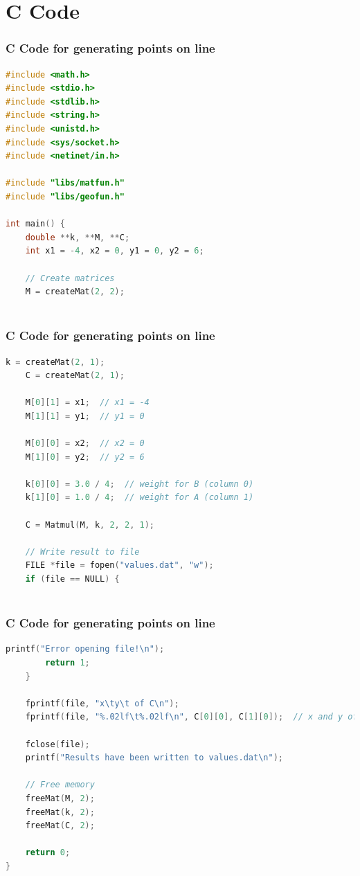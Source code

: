 \documentclass{beamer}
\theoremstyle{remark}
\numberwithin{equation}{section}
\begin{document}
\section{C Code}
\begin{frame}[fragile]
\frametitle{C Code for generating points on line}
\begin{lstlisting}[language=C]
#include <math.h>
#include <stdio.h>
#include <stdlib.h>
#include <string.h>
#include <unistd.h>
#include <sys/socket.h>
#include <netinet/in.h>

#include "libs/matfun.h"
#include "libs/geofun.h"

int main() {
    double **k, **M, **C;
    int x1 = -4, x2 = 0, y1 = 0, y2 = 6;

    // Create matrices
    M = createMat(2, 2);
 
    \end{lstlisting}
\end{frame}
\begin{frame}[fragile]
\frametitle{C Code for generating points on line}
\begin{lstlisting}[language=C]
   k = createMat(2, 1);
    C = createMat(2, 1);

    M[0][1] = x1;  // x1 = -4
    M[1][1] = y1;  // y1 = 0

    M[0][0] = x2;  // x2 = 0
    M[1][0] = y2;  // y2 = 6
    
    k[0][0] = 3.0 / 4;  // weight for B (column 0)
    k[1][0] = 1.0 / 4;  // weight for A (column 1)

    C = Matmul(M, k, 2, 2, 1);

    // Write result to file
    FILE *file = fopen("values.dat", "w");
    if (file == NULL) {
 
\end{lstlisting}
\end{frame}

\begin{frame}[fragile]
\frametitle{C Code for generating points on line}
\begin{lstlisting}[language=C]
       printf("Error opening file!\n");
        return 1;
    }

    fprintf(file, "x\ty\t of C\n");
    fprintf(file, "%.02lf\t%.02lf\n", C[0][0], C[1][0]);  // x and y of C

    fclose(file);
    printf("Results have been written to values.dat\n");

    // Free memory
    freeMat(M, 2);
    freeMat(k, 2);
    freeMat(C, 2);

    return 0;
}
\end{lstlisting}
\end{frame}
\end{document}
